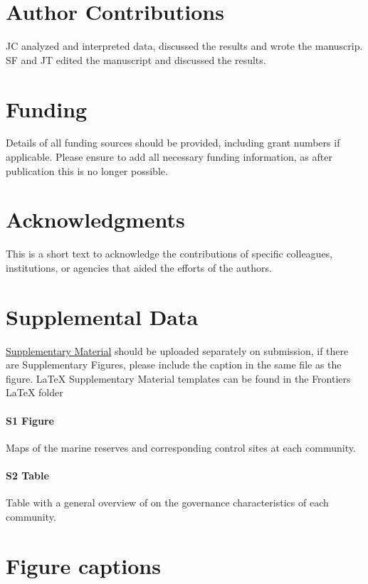 \documentclass{frontiersSCNS}
\begin{document}
\section*{Author Contributions}

JC analyzed and interpreted data, discussed the results and wrote the
manuscrip. SF and JT edited the manuscript and discussed the results.

\section*{Funding}

Details of all funding sources should be provided, including grant
numbers if applicable. Please ensure to add all necessary funding
information, as after publication this is no longer possible.

\section*{Acknowledgments}

This is a short text to acknowledge the contributions of specific
colleagues, institutions, or agencies that aided the efforts of the
authors.

\section*{Supplemental Data}

\href{http://home.frontiersin.org/about/author-guidelines#SupplementaryMaterial}{Supplementary Material}
should be uploaded separately on submission, if there are Supplementary
Figures, please include the caption in the same file as the figure.
LaTeX Supplementary Material templates can be found in the Frontiers
LaTeX folder

\paragraph*{S1 Figure}
\label{S1_Figure}

Maps of the marine reserves and corresponding control sites at each
community.

\paragraph*{S2 Table}
\label{S2_Table}

Table with a general overview of on the governance characteristics of
each community.



\section*{Figure captions}
\end{document}
